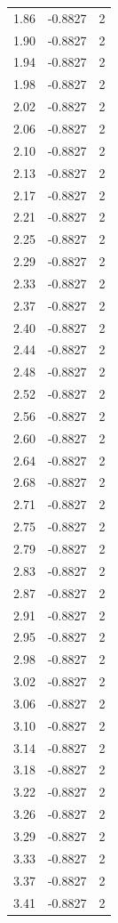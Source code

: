 \begin{longtable}{lrr}
  1.86 & -0.8827 & 2 \\
  1.90 & -0.8827 & 2 \\
  1.94 & -0.8827 & 2 \\
  1.98 & -0.8827 & 2 \\
  2.02 & -0.8827 & 2 \\
  2.06 & -0.8827 & 2 \\
  2.10 & -0.8827 & 2 \\
  2.13 & -0.8827 & 2 \\
  2.17 & -0.8827 & 2 \\
  2.21 & -0.8827 & 2 \\
  2.25 & -0.8827 & 2 \\
  2.29 & -0.8827 & 2 \\
  2.33 & -0.8827 & 2 \\
  2.37 & -0.8827 & 2 \\
  2.40 & -0.8827 & 2 \\
  2.44 & -0.8827 & 2 \\
  2.48 & -0.8827 & 2 \\
  2.52 & -0.8827 & 2 \\
  2.56 & -0.8827 & 2 \\
  2.60 & -0.8827 & 2 \\
  2.64 & -0.8827 & 2 \\
  2.68 & -0.8827 & 2 \\
  2.71 & -0.8827 & 2 \\
  2.75 & -0.8827 & 2 \\
  2.79 & -0.8827 & 2 \\
  2.83 & -0.8827 & 2 \\
  2.87 & -0.8827 & 2 \\
  2.91 & -0.8827 & 2 \\
  2.95 & -0.8827 & 2 \\
  2.98 & -0.8827 & 2 \\
  3.02 & -0.8827 & 2 \\
  3.06 & -0.8827 & 2 \\
  3.10 & -0.8827 & 2 \\
  3.14 & -0.8827 & 2 \\
  3.18 & -0.8827 & 2 \\
  3.22 & -0.8827 & 2 \\
  3.26 & -0.8827 & 2 \\
  3.29 & -0.8827 & 2 \\
  3.33 & -0.8827 & 2 \\
  3.37 & -0.8827 & 2 \\
  3.41 & -0.8827 & 2 \\

\end{longtable}
